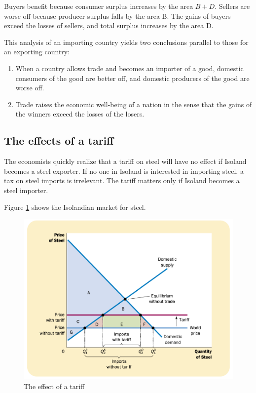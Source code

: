 Buyers benefit because consumer surplus increases by the area $B+D$. Sellers are worse off because producer surplus falls by the area B. The gains of buyers exceed the losses of sellers, and total surplus increases by the area D.


This analysis of an importing country yields two conclusions parallel to those for an exporting country:
\begin{enumerate}
\item When a country allows trade and becomes an importer of a good, domestic consumers of the good are better off, and domestic producers of the good are worse off.
\item Trade raises the economic well-being of a nation in the sense that the gains of the winners exceed the losses of the losers.
\end{enumerate}


\subsection{The effects of a tariff}

The economists quickly realize that a tariff on steel will have no effect if Isoland becomes a steel exporter.
If no one in Isoland is interested in importing steel, a tax on steel imports is irrelevant.
The tariff matters only if Isoland becomes a steel importer.



Figure \ref{fig:the-effect-of-a-tariff} shows the Isolandian market for steel.

\begin{figure}[!ht]
  \centering
  \includegraphics[width=\textwidth]{pics/the-effect-of-a-tariff}
  \caption{The effect of a tariff}
  \label{fig:the-effect-of-a-tariff}
\end{figure}


